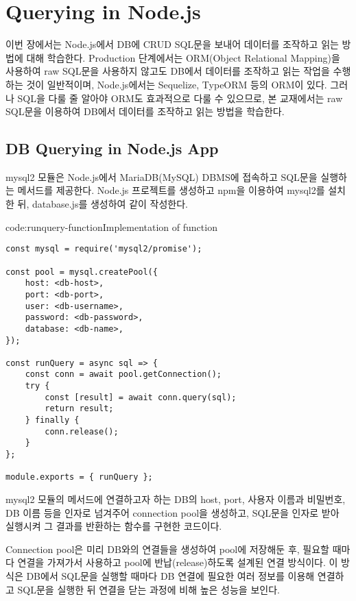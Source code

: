\section{Querying in Node.js}\label{sect:node-js-db-querying}

이번 장에서는 Node.js에서 DB에 CRUD SQL문을 보내어 데이터를 조작하고 읽는 방법에 대해 학습한다. Production 단계에서는 ORM(Object Relational Mapping)을 사용하여 raw SQL문을 사용하지 않고도 DB에서 데이터를 조작하고 읽는 작업을 수행하는 것이 일반적이며, Node.js에서는 Sequelize, TypeORM 등의 ORM이 있다. 그러나 SQL을 다룰 줄 알아야 ORM도 효과적으로 다룰 수 있으므로, 본 교재에서는 raw SQL문을 이용하여 DB에서 데이터를 조작하고 읽는 방법을 학습한다.

\subsection*{DB Querying in Node.js App}

mysql2 모듈은 Node.js에서 MariaDB(MySQL) DBMS에 접속하고 SQL문을 실행하는 메서드를 제공한다. Node.js 프로젝트를 생성하고 npm을 이용하여 mysql2를 설치한 뒤, database.js를 생성하여 \과 같이 작성한다.

\begin{code}{code:runquery-function}{Implementation of  function}
\begin{verbatim}
const mysql = require('mysql2/promise');

const pool = mysql.createPool({
    host: <db-host>,
    port: <db-port>,
    user: <db-username>,
    password: <db-password>,
    database: <db-name>,
});

const runQuery = async sql => {
    const conn = await pool.getConnection();
    try {
        const [result] = await conn.query(sql);
        return result;
    } finally {
        conn.release();
    }
};

module.exports = { runQuery };
\end{verbatim}
\end{code}

\은 mysql2 모듈의  메서드에 연결하고자 하는 DB의 host, port, 사용자 이름과 비밀번호, DB 이름 등을 인자로 넘겨주어 connection pool을 생성하고, SQL문을 인자로 받아 실행시켜 그 결과를 반환하는  함수를 구현한 코드이다.

Connection pool은 미리 DB와의 연결들을 생성하여 pool에 저장해둔 후, 필요할 때마다 연결을 가져가서 사용하고  pool에 반납(release)하도록 설계된 연결 방식이다. 이 방식은 DB에서 SQL문을 실행할 때마다 DB 연결에 필요한 여러 정보를 이용해 연결하고 SQL문을 실행한 뒤 연결을 닫는 과정에 비해 높은 성능을 보인다.
\clearpage

